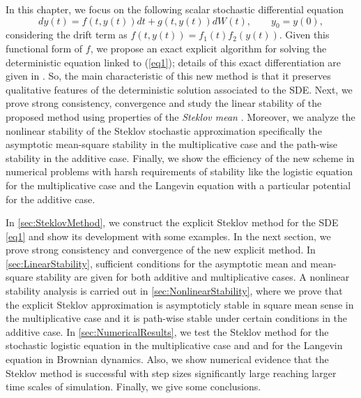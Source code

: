 	In this chapter, we focus on the following scalar stochastic differential equation
\begin{equation}\label{eq1}
	dy(t)=f(t,y(t))dt+g(t,y(t))dW(t), \qquad y_0=y(0),
\end{equation}
considering the drift term as $f(t,y(t))=f_1(t)f_2(y(t))$. Given this functional 
form of $f$, we propose an exact
explicit algorithm for solving the  deterministic equation linked to (\ref{eq1});
details of this exact differentiation are given in \cite{Matus2005}. So, the main
characteristic of this new method is that it preserves qualitative features of the
deterministic solution associated  to the SDE. Next, we prove strong consistency,
convergence and study the linear stability of the proposed method using properties
of the {\it Steklov mean} \cite{Timan1963}.  Moreover,  we analyze the nonlinear
stability of the Steklov stochastic approximation  specifically the asymptotic
mean-square stability in the multiplicative case and the  path-wise stability in the
additive case. Finally, we show  the efficiency of the new  scheme in numerical
problems with harsh requirements of  stability like the logistic  equation for the
multiplicative case and the Langevin  equation with a particular potential  for the
additive case.

	In \cref{sec:SteklovMethod}, we construct the explicit
Steklov method  for the SDE \eqref{eq1} and show its development  with some examples.
In the next section, we prove strong consistency and convergence of the new explicit
method. In \cref{sec:LinearStability}, sufficient conditions for the asymptotic mean and
mean-square  stability are given for both additive and multiplicative cases. A
nonlinear  stability  analysis is carried out in \cref{sec:NonlinearStability}, where we prove
that the  explicit Steklov  approximation is asymptoticly stable in square mean sense
in the  multiplicative case and  it is path-wise stable under certain conditions in
the additive  case. In \cref{sec:NumericalResults},  we test the Steklov method for
the stochastic  logistic equation in the  multiplicative case and and for the Langevin
equation in  Brownian dynamics. Also, we show  numerical evidence that the Steklov
method  is successful  with step sizes significantly  large reaching larger time
scales of simulation. Finally,  we give some conclusions.